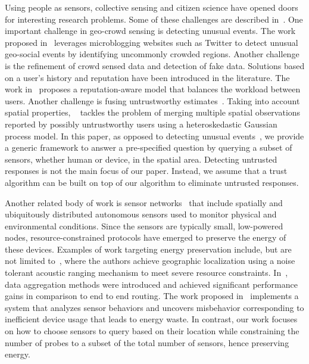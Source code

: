 \documentclass{acm_proc_article-sp}
\begin{document}
Using people as sensors, collective sensing and citizen science have opened doors for interesting research problems. Some of these challenges are described in~\cite{blaschke2011collective}. One important challenge in geo-crowd sensing is detecting unusual events. The work proposed in~\cite{lee2010measuring} leverages microblogging websites such as Twitter to detect unusual geo-social events by identifying uncommonly crowded regions. Another challenge is the refinement of crowd sensed data and detection of fake data. Solutions based on a user's history and reputation have been introduced in the literature. The work in~\cite{yu2013reputation} proposes a reputation-aware model that balances the workload between users. Another challenge is fusing untrustworthy estimates~\cite{venanzi2013trust}. Taking into account spatial properties, ~\cite{venanzi2013crowdsourcing} tackles the problem of merging multiple spatial observations reported by possibly untrustworthy users using a heteroskedastic Gaussian process model. In this paper, as opposed to detecting unusual events~\cite{blaschke2011collective}, we provide a generic framework to answer a pre-specified question by querying a subset of sensors, whether human or device, in the spatial area. Detecting untrusted responses is not the main focus of our paper. Instead, we assume that a trust algorithm can be built on top of our algorithm to eliminate untrusted responses.\par

Another related body of work is sensor networks~\cite{akyildiz2002survey} that include spatially and ubiquitously distributed autonomous sensors used to monitor physical and environmental conditions. Since the sensors are typically small, low-powered nodes, resource-constrained protocols have emerged to preserve the energy of these devices. Examples of work targeting energy preservation include, but are not limited to~\cite{sallai2004acoustic}, where the authors achieve geographic localization using a noise tolerant acoustic ranging mechanism to meet severe resource constraints. In~\cite{krishnamachari2002impact}, data aggregation methods were introduced and achieved significant performance gains in comparison to end to end routing. The work proposed in~\cite{fontugne2013strip} implements a system that analyzes sensor behaviors and uncovers misbehavior corresponding to inefficient device usage that leads to energy waste. In contrast, our work focuses on how to choose sensors to query based on their location while constraining the number of probes to a subset of the total number of sensors, hence preserving energy.
\end{document}

